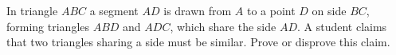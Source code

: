 In triangle $ABC$ a segment $AD$ is drawn from $A$ to a point $D$ on side $BC$, forming triangles $ABD$ and $ADC$, which share the side $AD$. A student claims that two triangles sharing a side must be similar. Prove or disprove this claim.
